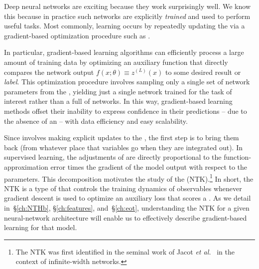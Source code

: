 Deep neural networks are exciting because they work surprisingly well. We know this because in practice such networks are explicitly \emph{trained} and used to perform useful tasks. Most commonly, learning occurs by repeatedly updating the  via a gradient-based optimization procedure such as . 

In particular, gradient-based learning algorithms can efficiently process a large amount of training data by optimizing an auxiliary  function that directly compares the network output $f(x;\theta) \equiv z^{(L)}(x)$ to some desired result or \emph{label}. 
This optimization procedure involves sampling only a single set of network parameters from the , yielding just a single network trained for the task of interest rather than a full  of networks. 
In this way, gradient-based learning methods offset their inability to express confidence in their predictions -- due to the absence of an  -- with data efficiency and easy scalability. 




Since  involves making explicit updates to the , the first step is to bring them back (from whatever place that variables go when they are integrated out). 
In supervised learning, the adjustments of  are directly proportional to the function-approximation error times the gradient of the model output with respect to the parameters.
This decomposition motivates the study of the  (NTK).\footnote{The NTK was first identified in the seminal work of 
Jacot \emph{et al.}~\cite{jacot2018neural} in the context of infinite-width networks.
}
In short, the NTK is a type of   that controls the training dynamics of observables whenever gradient descent is used to optimize an auxiliary loss that scores a . As we detail 
in~\S\ref{ch:NTHb}, \S\ref{ch:features}, and~\S\ref{ch:eot},
understanding the NTK for a given neural-network architecture will enable us to effectively describe gradient-based learning for that model.



